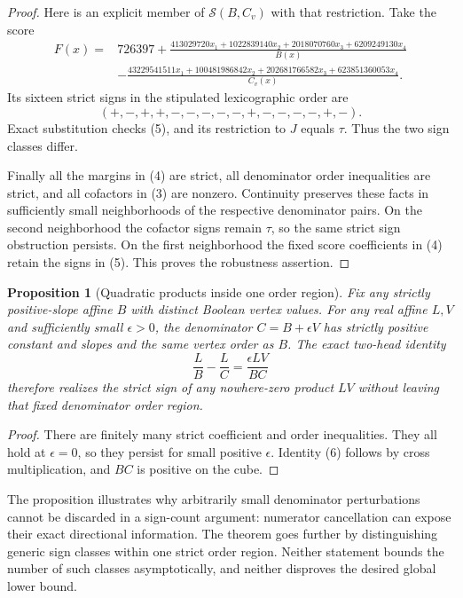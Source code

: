 \documentclass[11pt]{article}
\newtheorem{proposition}[theorem]{Proposition}
\begin{document}
\begin{proof}
Here is an explicit member of $\mathcal S(B,C_v)$ with that
restriction. Take the score
\[
 \begin{split}
 F(x)={}&726397+
 \frac{413029720x_1+1022839140x_2+2018070760x_3+6209249130x_4}{B(x)}\\
 &-\frac{43229541511x_1+100481986842x_2+
              202681766582x_3+623851360053x_4}{C_v(x)}.
 \end{split}
 \tag{4}
\]
Its sixteen strict signs in the stipulated lexicographic order are
\[
                  (+,-,+,+,-,-,-,-,-,+,-,-,-,-,+,-).
 \tag{5}
\]
Exact substitution checks (5), and its restriction to $J$ equals
$\tau$. Thus the two sign classes differ.

Finally all the margins in (4) are strict, all denominator order
inequalities are strict, and all cofactors in (3) are nonzero.
Continuity preserves these facts in sufficiently small neighborhoods
of the respective denominator pairs. On the second neighborhood the
cofactor signs remain $\tau$, so the same strict sign obstruction
persists. On the first neighborhood the fixed score coefficients in
(4) retain the signs in (5). This proves the robustness assertion.
\end{proof}

\begin{proposition}[Quadratic products inside one order region]
Fix any strictly positive-slope affine $B$ with distinct Boolean
vertex values. For any real affine $L,V$ and sufficiently small
$\epsilon>0$, the denominator $C=B+\epsilon V$ has strictly
positive constant and slopes and the same vertex order as $B$.
The exact two-head identity
\[
 \frac{L}{B}-\frac{L}{C}
                  =\frac{\epsilon LV}{BC}
 \tag{6}
\]
therefore realizes the strict sign of any nowhere-zero product $LV$
without leaving that fixed denominator order region.
\end{proposition}
\begin{proof}
There are finitely many strict coefficient and order inequalities.
They all hold at $\epsilon=0$, so they persist for small positive
$\epsilon$. Identity (6) follows by cross multiplication, and $BC$
is positive on the cube.
\end{proof}

The proposition illustrates why arbitrarily small denominator
perturbations cannot be discarded in a sign-count argument: numerator
cancellation can expose their exact directional information. The
theorem goes further by distinguishing generic sign classes within
one strict order region. Neither statement bounds the number of such
classes asymptotically, and neither disproves the desired global lower
bound.
\end{document}
